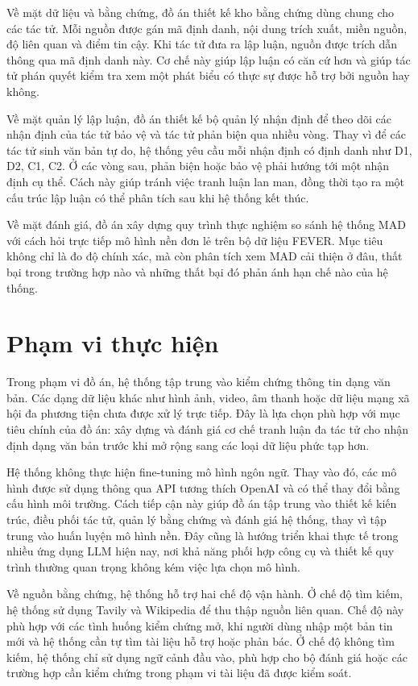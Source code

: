 ﻿\documentclass[oneside,a4paper,12pt]{extreport}
\begin{document}
Về mặt dữ liệu và bằng chứng, đồ án thiết kế kho bằng chứng dùng chung cho các tác tử. Mỗi nguồn được gán mã định danh, nội dung trích xuất, miền nguồn, độ liên quan và điểm tin cậy. Khi tác tử đưa ra lập luận, nguồn được trích dẫn thông qua mã định danh này. Cơ chế này giúp lập luận có căn cứ hơn và giúp tác tử phán quyết kiểm tra xem một phát biểu có thực sự được hỗ trợ bởi nguồn hay không.

Về mặt quản lý lập luận, đồ án thiết kế bộ quản lý nhận định để theo dõi các nhận định của tác tử bảo vệ và tác tử phản biện qua nhiều vòng. Thay vì để các tác tử sinh văn bản tự do, hệ thống yêu cầu mỗi nhận định có định danh như D1, D2, C1, C2. Ở các vòng sau, phản biện hoặc bảo vệ phải hướng tới một nhận định cụ thể. Cách này giúp tránh việc tranh luận lan man, đồng thời tạo ra một cấu trúc lập luận có thể phân tích sau khi hệ thống kết thúc.

Về mặt đánh giá, đồ án xây dựng quy trình thực nghiệm so sánh hệ thống MAD với cách hỏi trực tiếp mô hình nền đơn lẻ trên bộ dữ liệu FEVER. Mục tiêu không chỉ là đo độ chính xác, mà còn phân tích xem MAD cải thiện ở đâu, thất bại trong trường hợp nào và những thất bại đó phản ánh hạn chế nào của hệ thống.

\section{Phạm vi thực hiện}

Trong phạm vi đồ án, hệ thống tập trung vào kiểm chứng thông tin dạng văn bản. Các dạng dữ liệu khác như hình ảnh, video, âm thanh hoặc dữ liệu mạng xã hội đa phương tiện chưa được xử lý trực tiếp. Đây là lựa chọn phù hợp với mục tiêu chính của đồ án: xây dựng và đánh giá cơ chế tranh luận đa tác tử cho nhận định dạng văn bản trước khi mở rộng sang các loại dữ liệu phức tạp hơn.

Hệ thống không thực hiện fine-tuning mô hình ngôn ngữ. Thay vào đó, các mô hình được sử dụng thông qua API tương thích OpenAI và có thể thay đổi bằng cấu hình môi trường. Cách tiếp cận này giúp đồ án tập trung vào thiết kế kiến trúc, điều phối tác tử, quản lý bằng chứng và đánh giá hệ thống, thay vì tập trung vào huấn luyện mô hình nền. Đây cũng là hướng triển khai thực tế trong nhiều ứng dụng LLM hiện nay, nơi khả năng phối hợp công cụ và thiết kế quy trình thường quan trọng không kém việc lựa chọn mô hình.

Về nguồn bằng chứng, hệ thống hỗ trợ hai chế độ vận hành. Ở chế độ tìm kiếm, hệ thống sử dụng Tavily và Wikipedia để thu thập nguồn liên quan. Chế độ này phù hợp với các tình huống kiểm chứng mở, khi người dùng nhập một bản tin mới và hệ thống cần tự tìm tài liệu hỗ trợ hoặc phản bác. Ở chế độ không tìm kiếm, hệ thống chỉ sử dụng ngữ cảnh đầu vào, phù hợp cho bộ đánh giá hoặc các trường hợp cần kiểm chứng trong phạm vi tài liệu đã được kiểm soát.
\end{document}
